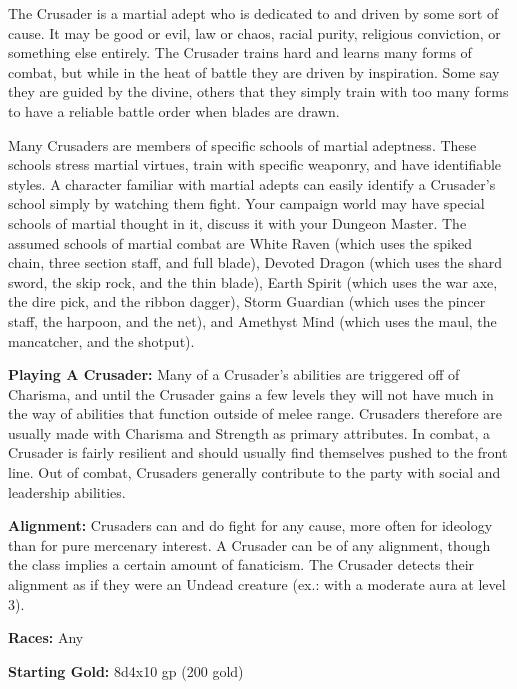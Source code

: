 
The Crusader is a martial adept who is dedicated to and driven by some sort of cause. It may be good or evil, law or chaos, racial purity, religious conviction, or something else entirely. The Crusader trains hard and learns many forms of combat, but while in the heat of battle they are driven by inspiration. Some say they are guided by the divine, others that they simply train with too many forms to have a reliable battle order when blades are drawn.

Many Crusaders are members of specific schools of martial adeptness. These schools stress martial virtues, train with specific weaponry, and have identifiable styles. A character familiar with martial adepts can easily identify a Crusader's school simply by watching them fight. Your campaign world may have special schools of martial thought in it, discuss it with your Dungeon Master. The assumed schools of martial combat are White Raven (which uses the spiked chain, three section staff, and full blade), Devoted Dragon (which uses the shard sword, the skip rock, and the thin blade), Earth Spirit (which uses the war axe, the dire pick, and the ribbon dagger), Storm Guardian (which uses the pincer staff, the harpoon, and the net), and Amethyst Mind (which uses the maul, the mancatcher, and the shotput).

\textbf{Playing A Crusader:} Many of a Crusader's abilities are triggered off of Charisma, and until the Crusader gains a few levels they will not have much in the way of abilities that function outside of melee range. Crusaders therefore are usually made with Charisma and Strength as primary attributes. In combat, a Crusader is fairly resilient and should usually find themselves pushed to the front line. Out of combat, Crusaders generally contribute to the party with social and leadership abilities.

\textbf{Alignment:} Crusaders can and do fight for any cause, more often for ideology than for pure mercenary interest. A Crusader can be of any alignment, though the class implies a certain amount of fanaticism. The Crusader detects their alignment as if they were an Undead creature (ex.: with a moderate aura at level 3).

\textbf{Races:} Any

\textbf{Starting Gold:} 8d4x10 gp (200 gold)

